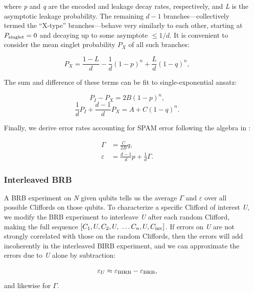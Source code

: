 \documentclass[aps,prl,twocolumn,superscriptaddress,nobibnotes,10pt,floatfix]{revtex4-2}
\newcommand{\ts}[2]{{#1}_{\textnormal{#2}}}
\begin{document}
where \emph{p} and \emph{q} are the encoded and leakage decay rates, respectively, and \emph{L} is the asymptotic leakage probability.
The remaining \(d - 1\) branches---collectively termed the ``X-type'' branches---behave very similarly to each other, starting at \(\ts{P}{singlet} = 0\) and decaying up to some asymptote \(\leq {1}/{d}\).
It is convenient to consider the mean singlet probability \(P_{X}\) of all such branches:

\begin{equation}
P_{X} = \frac{1 - L}{d} - \frac{1}{d}(1 - p)^{n} + \frac{L}{d}(1 - q)^{n},
\end{equation}

The sum and difference of these terms can be fit to single-exponential ansatz:

\begin{equation}\label{eq:birb_fit1}
P_{I} - P_{X} = 2B(1 - p)^{n},
\end{equation}
\begin{equation}\label{eq:birb_fit2}
\frac{1}{d}P_{I} + \frac{d - 1}{d}P_{X} = A + C(1 - q)^{n}.
\end{equation}

Finally, we derive error rates accounting for SPAM error following the algebra in \cite{s_andrews_quantifying_2019}:

\begin{align}
\Gamma &= \frac{C}{2B}q, \\
\varepsilon &= \frac{d - 1}{d}p + \frac{1}{d}\Gamma.
\end{align}

\subsubsection{Interleaved BRB}\label{interleaved-brb}

A BRB experiment on \emph{N} given qubits tells us the average \(\Gamma\) and \(\varepsilon\) over all possible Cliffords on those qubits.
To characterize a specific Clifford of interest \emph{U}, we modify the BRB experiment to interleave \emph{U} after each random Clifford, making the full sequence \([C_{1},U,C_{2},U,\ \ldots C_{n},U,\ts{C}{inv}]\).
If errors on \emph{U} are not strongly correlated with those on the random Cliffords, then the errors will add incoherently in the interleaved BIRB experiment, and we can approximate the errors due to \emph{U} alone by subtraction:

\begin{equation}
\varepsilon_{U} \approx \ts\varepsilon{BIRB} - \ts\varepsilon{BRB},
\end{equation}
and likewise for \(\Gamma\).
\end{document}
